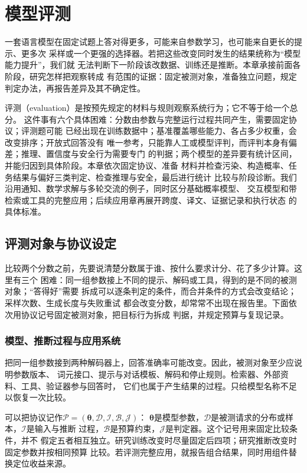 \chapter{模型评测}
\label{chap:nlp-evaluation}

一套语言模型在固定试题上答对得更多，可能来自参数学习，也可能来自更长的提示、更多次
采样或一个更强的选择器。若把这些改变同时发生的结果统称为“模型能力提升”，我们就
无法判断下一阶段该改数据、训练还是推断。本章承接前面各阶段，研究怎样把观察转成
有范围的证据：固定被测对象，准备独立问题，规定判定办法，再报告差异及其不确定性。

评测（evaluation）是按预先规定的材料与规则观察系统行为；它不等于给一个总分。
这件事有六个具体困难：分数由参数与完整运行过程共同产生，需要固定协议；评测题可能
已经出现在训练数据中；基准覆盖哪些能力、各占多少权重，会改变排序；开放式回答没有
唯一参考，只能靠人工或模型评判，而评判本身有偏差；推理、置信度与安全行为需要专门
的判据；两个模型的差异要有统计区间，并能归因到具体阶段。本章依次固定协议、准备
材料并检查污染、构造概率、任务结果与偏好三类判定、检查推理与安全，最后进行统计
比较与阶段诊断。我们沿用通知、数学求解与多轮交流的例子，同时区分基础概率模型、
交互模型和带检索或工具的完整应用；后续应用章再展开跨度、译文、证据记录和执行状态
的具体标准。

\section{评测对象与协议设定}
\label{sec:nlp-eval-protocol}

比较两个分数之前，先要说清楚分数属于谁、按什么要求计分、花了多少计算。这里有三个
困难：同一组参数接上不同的提示、解码或工具，得到的是不同的被测对象；“答得好”需要
拆成可以逐条判定的条件，而合并条件的方式会改变结论；采样次数、生成长度与失败重试
都会改变分数，却常常不出现在报告里。下面依次用协议记号固定被测对象，把目标行为拆成
判据，并规定预算与复现记录。

\subsection{模型、推断过程与应用系统}
\label{sec:nlp-eval-unit}

把同一组参数接到两种解码器上，回答准确率可能改变。因此，被测对象至少应说明参数版本、
词元接口、提示与对话模板、解码和停止规则。检索器、外部资料、工具、验证器参与回答时，
它们也属于产生结果的过程。只给模型名称不足以恢复一次比较。

可以把协议记作$\mathcal P=(\bm\theta,\mathcal D,\mathcal I,\mathcal B,\mathcal J)$：
$\bm\theta$是模型参数，$\mathcal D$是被测请求的分布或样本，$\mathcal I$是输入与推断
过程，$\mathcal B$是预算约束，$\mathcal J$是判定器。这个记号用来固定比较条件，并不
假定五者相互独立。研究训练改变时尽量固定后四项；研究推断改变时固定参数并按相同预算
比较。若评测完整应用，就报告组合结果，同时用组件替换定位收益来源。

